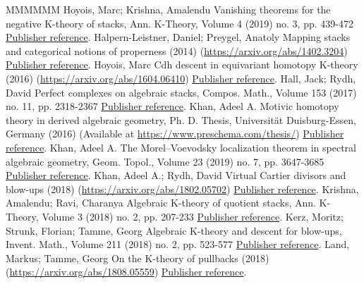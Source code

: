 \begin{thebibliography}{MMMMMM}
 Hoyois, Marc; Krishna, Amalendu Vanishing theorems for the negative K-theory of stacks, Ann. K-Theory, Volume 4 (2019) no. 3, pp. 439-472 \href{https://ahl.centre-mersenne.org/item/AHL_2020__3__1091_0/#HoyoisKrishna}{Publisher reference}.
 Halpern-Leistner, Daniel; Preygel, Anatoly Mapping stacks and categorical notions of properness (2014) (\url{https://arxiv.org/abs/1402.3204}) \href{https://ahl.centre-mersenne.org/item/AHL_2020__3__1091_0/#HalpernLeistnerPreygel}{Publisher reference}.
 Hoyois, Marc Cdh descent in equivariant homotopy K-theory (2016) (\url{https://arxiv.org/abs/1604.06410}) \href{https://ahl.centre-mersenne.org/item/AHL_2020__3__1091_0/#HoyoisCdh}{Publisher reference}.
 Hall, Jack; Rydh, David Perfect complexes on algebraic stacks, Compos. Math., Volume 153 (2017) no. 11, pp. 2318-2367 \href{https://ahl.centre-mersenne.org/item/AHL_2020__3__1091_0/#HallRydhPerfect}{Publisher reference}.
 Khan, Adeel A. Motivic homotopy theory in derived algebraic geometry, Ph. D. Thesis, Universität Duisburg-Essen, Germany (2016) (Available at \url{https://www.preschema.com/thesis/}) \href{https://ahl.centre-mersenne.org/item/AHL_2020__3__1091_0/#KhanThesis}{Publisher reference}.
 Khan, Adeel A. The Morel–Voevodsky localization theorem in spectral algebraic geometry, Geom. Topol., Volume 23 (2019) no. 7, pp. 3647-3685 \href{https://ahl.centre-mersenne.org/item/AHL_2020__3__1091_0/#KhanLocalization}{Publisher reference}.
 Khan, Adeel A.; Rydh, David Virtual Cartier divisors and blow-ups (2018) (\url{https://arxiv.org/abs/1802.05702}) \href{https://ahl.centre-mersenne.org/item/AHL_2020__3__1091_0/#KhanBlowup}{Publisher reference}.
 Krishna, Amalendu; Ravi, Charanya Algebraic K-theory of quotient stacks, Ann. K-Theory, Volume 3 (2018) no. 2, pp. 207-233 \href{https://ahl.centre-mersenne.org/item/AHL_2020__3__1091_0/#KrishnaRavi}{Publisher reference}.
 Kerz, Moritz; Strunk, Florian; Tamme, Georg Algebraic K-theory and descent for blow-ups, Invent. Math., Volume 211 (2018) no. 2, pp. 523-577 \href{https://ahl.centre-mersenne.org/item/AHL_2020__3__1091_0/#KerzStrunkTamme}{Publisher reference}.
 Land, Markus; Tamme, Georg On the K-theory of pullbacks (2018) (\url{https://arxiv.org/abs/1808.05559}) \href{https://ahl.centre-mersenne.org/item/AHL_2020__3__1091_0/#LandTamme}{Publisher reference}.

\end{thebibliography}
